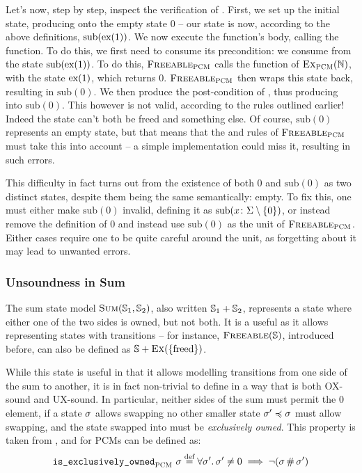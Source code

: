 Let's now, step by step, inspect the verification of . First, we set up the initial state, producing  onto the empty state $0$ -- our state is now, according to the above definitions, $\text{sub}(\text{ex}(1))$. We now execute the function's body, calling the  function. To do this, we first need to consume its precondition: we consume  from the state $\text{sub}(\text{ex}(1))$. To do this, $\textsc{Freeable}_{\textsc{PCM}}$ calls the \consume{} function of $\textsc{Ex}_{\textsc{PCM}}(\mathbb N)$, with the state $\text{ex}(1)$, which returns $0$. $\textsc{Freeable}_{\textsc{PCM}}$ then wraps this state back, resulting in $\text{sub}(0)$. We then produce the post-condition of , thus producing \corepred{\freedP}{}{} into $\text{sub}(0)$. This however is not valid, according to the rules outlined earlier! Indeed the state can't both be freed and something else. Of course, $\text{sub}(0)$ represents an empty state, but that means that the \consume{} and \produce{} rules of $\textsc{Freeable}_{\textsc{PCM}}$ must take this into account -- a simple implementation could miss it, resulting in such errors.

This difficulty in fact turns out from the existence of both $0$ and $\text{sub}(0)$ as two distinct states, despite them being the same semantically: empty. To fix this, one must either make $\text{sub}(0)$ invalid, defining it as $\text{sub}(x\colon \Sigma \setminus \{0\})$, or instead remove the definition of $0$ and instead use $\text{sub}(0)$ as the unit of $\textsc{Freeable}_{\textsc{PCM}}$. Either cases require one to be quite careful around the unit, as forgetting about it may lead to unwanted errors.

\subsubsection{Unsoundness in Sum}\label{sec:unsoundness-in-sum}

The sum state model $\textsc{Sum}(\mathbb S_1, \mathbb S_2)$, also written $\mathbb S_1 + \mathbb S_2$, represents a state where either one of the two sides is owned, but not both. It is a useful as it allows representing states with transitions -- for instance, $\textsc{Freeable}(\mathbb S)$, introduced before, can also be defined as $\mathbb S + \textsc{Ex}(\{\text{freed}\})$.

While this state is useful in that it allows modelling transitions from one side of the sum to another, it is in fact non-trivial to define in a way that is both OX-sound and UX-sound. In particular, neither sides of the sum must permit the $0$ element, if a state $\sigma$ allows swapping no other smaller state $\sigma'\preccurlyeq\sigma$ must allow swapping, and the state swapped into must be \emph{exclusively owned}. This property is taken from \cite{iris}, and for PCMs can be defined as: \begin{align*}
	\texttt{is\_exclusively\_owned}_{\textsc{PCM}}~\sigma \stackrel{\textnormal{def}}= \forall \sigma'\ldotp \sigma'\neq 0\implies \neg(\sigma\operatorname{\#}\sigma')
\end{align*}

